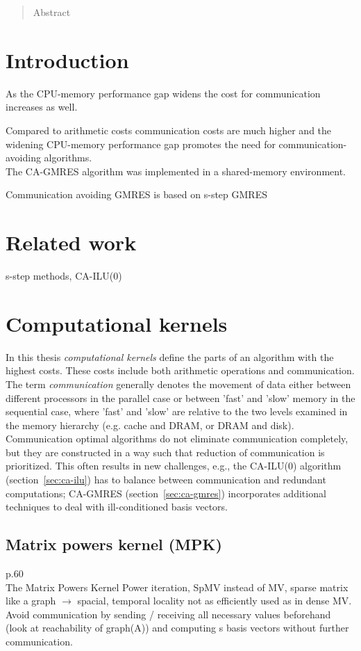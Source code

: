 \documentclass{scrartcl}
\begin{document}
\begin{abstract}
Abstract
\end{abstract}
\section{Introduction}
As the CPU-memory performance gap widens the cost for communication increases as well.

Compared to arithmetic costs communication costs are much higher and the widening CPU-memory performance gap promotes the need for communication-avoiding algorithms.\\

The CA-GMRES algorithm was implemented in a shared-memory environment.

Communication avoiding GMRES is based on s-step GMRES 
\cite{Erhel95aparallel}

\section{Related work}
s-step methods, CA-ILU(0)

\section{Computational kernels}
In this thesis \textit{computational kernels} define the parts of an algorithm with the highest costs. These costs include both arithmetic operations and communication.
The term \textit{communication} generally denotes the movement of data either between different processors in the parallel case or between 'fast' and 'slow' memory in the sequential case, where 'fast' and 'slow' are relative to the two levels examined in the memory hierarchy (e.g. cache and DRAM, or DRAM and disk). Communication optimal algorithms do not eliminate communication completely, but they are constructed in a way such that reduction of communication is prioritized. This often results in new challenges, e.g., the  CA-ILU(0) algorithm (section~\ref{sec:ca-ilu}) has to balance between communication and redundant computations; CA-GMRES (section~\ref{sec:ca-gmres}) incorporates additional techniques to deal with ill-conditioned basis vectors.

\subsection{Matrix powers kernel (MPK)}
\cite{Hoemmen:2010:CKS:1970638} p.60\\
The Matrix Powers Kernel 
Power iteration, SpMV instead of MV, sparse matrix like a graph $\rightarrow$ spacial, temporal locality not as efficiently used as in dense MV. 
Avoid communication by sending / receiving all necessary values beforehand (look at reachability of graph(A)) and computing s basis vectors without further communication.\\
\end{document}
